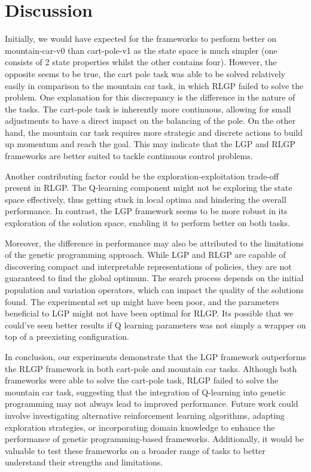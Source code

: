 \documentclass[12pt, final]{dalcsthesis}
\begin{document}
\section{Discussion}

Initially, we would have expected for the frameworks to perform better on mountain-car-v0 than cart-pole-v1 as the state space is much simpler (one consists of 2 state properties whilst the other contains four). However, the opposite seems to be true,
the cart pole task was able to be solved relatively easily in comparison to the mountain car task, in which RLGP failed to solve the problem. One explanation for this discrepancy is the difference in the nature of the tasks. The cart-pole task is inherently more continuous, allowing for small adjustments to have a direct impact on the balancing of the pole. On the other hand, the mountain car task requires more strategic and discrete actions to build up momentum and reach the goal. This may indicate that the LGP and RLGP frameworks are better suited to tackle continuous control problems.

Another contributing factor could be the exploration-exploitation trade-off present in RLGP. The Q-learning component might not be exploring the state space effectively, thus getting stuck in local optima and hindering the overall performance. In contrast, the LGP framework seems to be more robust in its exploration of the solution space, enabling it to perform better on both tasks.

Moreover, the difference in performance may also be attributed to the limitations of the genetic programming approach. While LGP and RLGP are capable of discovering compact and interpretable representations of policies, they are not guaranteed to find the global optimum. The search process depends on the initial population and variation operators, which can impact the quality of the solutions found. The experimental set up might have been poor, and the parameters beneficial to LGP might not have been optimal for RLGP. Its possible that
we could've seen better results if Q learning parameters was not simply a wrapper on top of a preexisting configuration.

In conclusion, our experiments demonstrate that the LGP framework outperforms the RLGP framework in both cart-pole and mountain car tasks. Although both frameworks were able to solve the cart-pole task, RLGP failed to solve the mountain car task, suggesting that the integration of Q-learning into genetic programming may not always lead to improved performance. Future work could involve investigating alternative reinforcement learning algorithms, adapting exploration strategies, or incorporating domain knowledge to enhance the performance of genetic programming-based frameworks. Additionally, it would be valuable to test these frameworks on a broader range of tasks to better understand their strengths and limitations.
\end{document}
